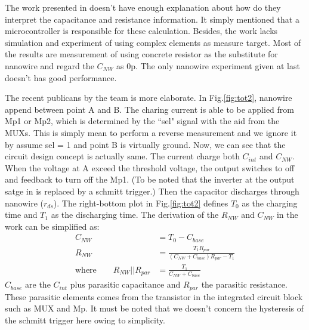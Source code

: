 The work presented in \cite{Juv1} doesn't have enough explanation about how do they interpret the capacitance and resistance information.
It simply mentioned that a microcontroller is responsible for these calculation.
Besides, the work lacks simulation and experiment of using complex elements as measure target.
Most of the results are measurement of using concrete resistor as the substitute for nanowire and regard the $C_{NW}$ as 0p.
The only nanowire experiment given at last doesn't has good performance.

The recent publicans \cite{Juv2} by the team is more elaborate.
In Fig.\ref{fig:tot2}, nanowire append between point A and B.
The charing current is able to be applied from Mp1 or Mp2, which is determined by the ``sel" signal with the aid from the MUXs.
This is simply mean to perform a reverse measurement and we ignore it by assume sel = 1 and point B is virtually ground.
Now, we can see that the circuit design concept is actually same.
The current charge both $C_{int}$ and $C_{NW}$.
When the voltage at A exceed the threshold voltage, the output switches to off and feedback to turn off the Mp1.
(To be noted that the inverter at the output satge in \cite{Juv1} is replaced by a schmitt trigger.)
Then the capacitor discharges through nanowire ($r_{ds}$).
The right-bottom plot in Fig.\ref{fig:tot2} defines $T_0$ as the charging time and $T_1$ as the discharging time.
The derivation of the $R_{NW}$ and $C_{NW}$ in the work can be simplified as:
\setlength{\mathindent}{2cm}
\begin{align}
                         C_{NW}            & = T_0 - C_{base}\\
                         R_{NW}            & = \frac{T_1R_{par}}{(C_{NW} + C_{base})R_{par} - T_1}\\
    \text{where} \qquad  R_{NW} || R_{par} & = \frac{T_1}{C_{NW} + C_{base}}
\end{align}
$C_{base}$ are the $C_{int}$ plus parasitic capacitance and $R_{par}$ the parasitic resistance.
These parasitic elements comes from the transistor in the integrated circuit block such as MUX and Mp.
It must be noted that we doesn't concern the hysteresis of the schmitt trigger here owing to simplicity.











